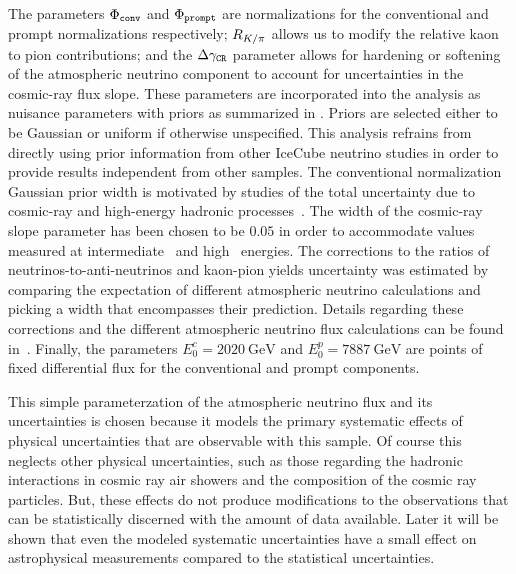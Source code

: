 The parameters $\Phi_\texttt{conv}$ and $\Phi_\texttt{prompt}$ are normalizations for the conventional and prompt normalizations respectively; $R_{K/\pi}$ allows us to modify the relative kaon to pion contributions; and the $\Delta\gamma_\texttt{CR}$ parameter allows for hardening or softening of the atmospheric neutrino component to account for uncertainties in the cosmic-ray flux slope.
These parameters are incorporated into the analysis as nuisance parameters with priors as summarized in .
Priors are selected either to be Gaussian or uniform if otherwise unspecified.
This analysis refrains from directly using prior information from other IceCube neutrino studies in order to provide results independent from other samples.
The conventional normalization Gaussian prior width is motivated by studies of the total uncertainty due to cosmic-ray and high-energy hadronic processes~\cite{Fedynitch:2012fs}.
The width of the cosmic-ray slope parameter has been chosen to be $0.05$ in order to accommodate values measured at intermediate~\cite{Karelin:2011zz} and high~\cite{Bartoli:2015fhw,Yoon:2017qjx,Alfaro:2017cwx} energies.
The corrections to the ratios of neutrinos-to-anti-neutrinos and kaon-pion yields uncertainty was estimated by comparing the expectation of different atmospheric neutrino calculations and picking a width that encompasses their prediction.
Details regarding these corrections and the different atmospheric neutrino flux calculations can be found in~\cite{CollinFluxes,Jones:2015bya}.
Finally, the parameters $E_0^c=\SI{2020}\GeV$ and $E_0^p=\SI{7887}\GeV$ are points of fixed differential flux for the conventional and prompt components.

This simple parameterzation of the atmospheric neutrino flux and its uncertainties is chosen because it models the primary systematic effects of physical uncertainties that are observable with this sample.
Of course this neglects other physical uncertainties, such as those regarding the hadronic interactions in cosmic ray air showers and the composition of the cosmic ray particles.
But, these effects do not produce modifications to the observations that can be statistically discerned with the amount of data available.
Later it will be shown that even the modeled systematic uncertainties have a small effect on astrophysical measurements compared to the statistical uncertainties.

